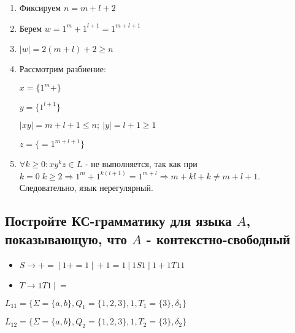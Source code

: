 \documentclass[a4paper,12pt]{article}
\begin{document}
        \begin{enumerate}
            \item Фиксируем $n = m + l + 2$
            \item Берем $w = 1^m + 1^{l+1} = 1^{m+l+1}$
            \item $|w| = 2(m + l) + 2 \geq n$
            \item Рассмотрим разбиение:
 
            $x = \{1^m+\}$
 
            $y = \{1^{l+1}\}$
 
            $|xy| = m + l + 1 \leq n; \: |y| = l + 1 \geq 1$
 
             $z = \{=1^{m+l+1}\}$
 
            \item $\forall k \geq 0: xy^kz \in L$ - не выполняется, так как при $k = 0 \; k \geq 2 \Rightarrow 1^m + 1^{k(l+1)} = 1^{m+l} \Rightarrow m + kl + k \neq m + l + 1$.  Следовательно, язык нерегулярный.
        \end{enumerate}
 
    \subsection{Постройте КС-грамматику для языка $A$, показывающую, что $A$ - контекстно-свободный}
 
        \begin{itemize}
            \item $S \to += \: | \: 1+=1 \: | \: +1=1 \: | \: 1S1 \: | \: 1+1T11$
 
            \item $T \to 1T1 \: | \: =$
        \end{itemize}


\begin{center}
    $L_11 = \{\Sigma = \{a, b\}, Q_1 = \{1, 2, 3\}, 1, T_1 = \{3\}, \delta_1 \}$
 
 
    $L_12 = \{\Sigma = \{a, b\}, Q_2 = \{1, 2, 3\}, 1, T_2 = \{3\}, \delta_2 \}$
 
\end{center}
\end{document}
